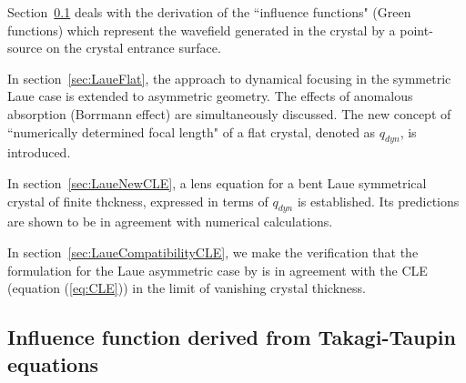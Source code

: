 \documentclass[preprint]{iucr}              %
\newcommand{\inblue}[1]{{\color{blue}#1}}
\newcommand{\inred}[1]{{\color{red}#1}}
\begin{document}
\inred{
Section~\ref{sec:influence} deals with the derivation of the ``influence functions" (Green functions) which represent the wavefield generated in the crystal by a point-source on the crystal entrance surface.

In section~\ref{sec:LaueFlat}, the approach to dynamical focusing in the symmetric Laue case
\cite{kushnir, GuigayFerrero2013}
is extended to asymmetric geometry. The effects of anomalous absorption (Borrmann effect) are simultaneously discussed. The new concept of ``numerically determined focal length" of a flat crystal, denoted as $q_{dyn}$, is introduced.

In section~\ref{sec:LaueNewCLE}, a lens equation for a bent Laue symmetrical crystal of finite thckness, expressed in terms of $q_{dyn}$ is established. Its predictions are shown to be in agreement with numerical calculations. 

In section~\ref{sec:LaueCompatibilityCLE}, we make the verification that the formulation for the Laue asymmetric case by
\cite{GuigayFerrero2016} is in agreement with the CLE (equation (\ref{eq:CLE})) in the limit of vanishing crystal thickness.}

\subsection{Influence function derived from Takagi-Taupin equations}
\label{sec:influence}
\end{document}
